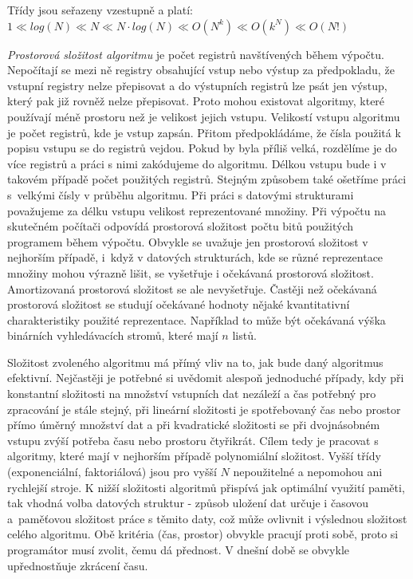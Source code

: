 \documentclass[12pt]{article}
\begin{document}
\noindent
Třídy jsou seřazeny vzestupně a platí:
\newline
$1 \ll log(N) \ll N \ll N \cdot log(N) \ll O(N^k) \ll  O(k^N) \ll O(N!)$

\textit{Prostorová složitost algoritmu} je počet registrů navštívených během výpočtu. Nepočítají se mezi ně registry obsahující vstup nebo výstup za předpokladu, že vstupní registry nelze přepisovat a do výstupních registrů lze psát jen výstup, který pak již rovněž nelze přepisovat. Proto mohou existovat algoritmy, které používají méně prostoru než je velikost jejich vstupu. Velikostí vstupu algoritmu je počet registrů, kde je vstup zapsán. Přitom předpokládáme, že čísla použitá k popisu vstupu se do registrů vejdou. Pokud by byla příliš velká, rozdělíme je do více registrů a práci s nimi zakódujeme do algoritmu. Délkou vstupu bude i v takovém případě počet použitých registrů. Stejným způsobem také ošetříme práci s~velkými čísly v průběhu algoritmu. Při práci s datovými strukturami považujeme za délku vstupu velikost reprezentované množiny.
\newline
\indent
Při výpočtu na skutečném počítači odpovídá prostorová složitost počtu bitů použitých programem během výpočtu. 
\newline
\indent
Obvykle se uvažuje jen prostorová složitost v nejhorším případě, i~když v datových strukturách, kde se různé reprezentace množiny mohou výrazně lišit, se vyšetřuje i očekávaná prostorová složitost. Amortizovaná prostorová složitost se ale nevyšetřuje. Častěji než očekávaná prostorová složitost se studují očekávané hodnoty nějaké kvantitativní charakteristiky použité reprezentace. Například to může být očekávaná výška binárních vyhledávacích stromů, které mají $n$ listů. \citep{koubek}

Složitost zvoleného algoritmu má přímý vliv na to, jak bude daný algoritmus efektivní. Nejčastěji je potřebné si uvědomit alespoň jednoduché případy, kdy při konstantní složitosti na množství vstupních dat nezáleží a čas potřebný pro zpracování je stále stejný, při lineární složitosti je spotřebovaný čas nebo prostor přímo úměrný množství dat a při kvadratické složitosti se při dvojnásobném vstupu zvýší potřeba času nebo prostoru čtyřikrát.
\newline
\indent
Cílem tedy je pracovat s algoritmy, které mají v nejhorším případě polynomiální složitost. Vyšší třídy (exponenciální, faktoriálová) jsou pro vyšší $N$ nepoužitelné a nepomohou ani rychlejší stroje. 
\newline
\indent
K nižší složitosti algoritmů přispívá jak optimální využití paměti, tak vhodná volba datových struktur - způsob uložení dat určuje i časovou a~paměťovou složitost práce s těmito daty, což může ovlivnit i výslednou složitost celého algoritmu.
\newline
\indent
Obě kritéria (čas, prostor) obvykle pracují proti sobě, proto si programátor musí zvolit, čemu dá přednost. V dnešní době se obvykle upřednostňuje zkrácení času. \citep{rybicka}
\end{document}
